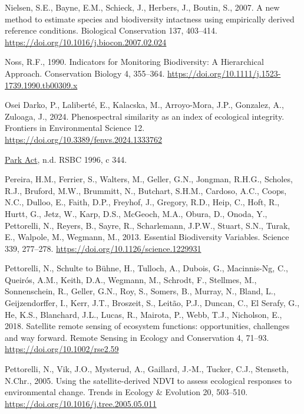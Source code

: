 \documentclass[
]{agujournal2019}
\newlength{\cslhangindent}
\newenvironment{CSLReferences}[2] %
 {\begin{list}{}{%
  \setlength{\itemindent}{0pt}
  \setlength{\leftmargin}{0pt}
  \setlength{\parsep}{0pt}
  \ifodd #1
   \setlength{\leftmargin}{\cslhangindent}
   \setlength{\itemindent}{-1\cslhangindent}
  \fi
  \setlength{\itemsep}{#2\baselineskip}}}
 {\end{list}}
\begin{document}
\begin{CSLReferences}{1}{0}
Nielsen, S.E., Bayne, E.M., Schieck, J., Herbers, J., Boutin, S., 2007.
A new method to estimate species and biodiversity intactness using
empirically derived reference conditions. Biological Conservation 137,
403--414. \url{https://doi.org/10.1016/j.biocon.2007.02.024}

Noss, R.F., 1990. Indicators for Monitoring Biodiversity: A Hierarchical
Approach. Conservation Biology 4, 355--364.
\url{https://doi.org/10.1111/j.1523-1739.1990.tb00309.x}

Osei Darko, P., Laliberté, E., Kalacska, M., Arroyo-Mora, J.P.,
Gonzalez, A., Zuloaga, J., 2024. Phenospectral similarity as an index of
ecological integrity. Frontiers in Environmental Science 12.
\url{https://doi.org/10.3389/fenvs.2024.1333762}

\href{https://www.bclaws.gov.bc.ca/civix/document/id/complete/statreg/96344_01}{Park
{Act}}, n.d. RSBC 1996, c 344.

Pereira, H.M., Ferrier, S., Walters, M., Geller, G.N., Jongman, R.H.G.,
Scholes, R.J., Bruford, M.W., Brummitt, N., Butchart, S.H.M., Cardoso,
A.C., Coops, N.C., Dulloo, E., Faith, D.P., Freyhof, J., Gregory, R.D.,
Heip, C., Hoft, R., Hurtt, G., Jetz, W., Karp, D.S., McGeoch, M.A.,
Obura, D., Onoda, Y., Pettorelli, N., Reyers, B., Sayre, R.,
Scharlemann, J.P.W., Stuart, S.N., Turak, E., Walpole, M., Wegmann, M.,
2013. Essential Biodiversity Variables. Science 339, 277--278.
\url{https://doi.org/10.1126/science.1229931}

Pettorelli, N., Schulte to Bühne, H., Tulloch, A., Dubois, G.,
Macinnis-Ng, C., Queirós, A.M., Keith, D.A., Wegmann, M., Schrodt, F.,
Stellmes, M., Sonnenschein, R., Geller, G.N., Roy, S., Somers, B.,
Murray, N., Bland, L., Geijzendorffer, I., Kerr, J.T., Broszeit, S.,
Leitão, P.J., Duncan, C., El Serafy, G., He, K.S., Blanchard, J.L.,
Lucas, R., Mairota, P., Webb, T.J., Nicholson, E., 2018. Satellite
remote sensing of ecosystem functions: opportunities, challenges and way
forward. Remote Sensing in Ecology and Conservation 4, 71--93.
\url{https://doi.org/10.1002/rse2.59}

Pettorelli, N., Vik, J.O., Mysterud, A., Gaillard, J.-M., Tucker, C.J.,
Stenseth, N.Chr., 2005. Using the satellite-derived NDVI to assess
ecological responses to environmental change. Trends in Ecology \&
Evolution 20, 503--510. \url{https://doi.org/10.1016/j.tree.2005.05.011}


\end{CSLReferences}
\end{document}
